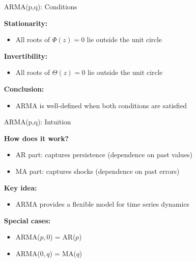 \documentclass[aspectratio=169]{beamer}
\begin{document}
\begin{frame}{ARMA(p,q): Conditions}

\textbf{Stationarity:}
\begin{itemize}
    \item All roots of $\Phi(z)=0$ lie outside the unit circle
\end{itemize}

\vspace{0.4cm}

\textbf{Invertibility:}
\begin{itemize}
    \item All roots of $\Theta(z)=0$ lie outside the unit circle
\end{itemize}

\vspace{0.4cm}

\textbf{Conclusion:}
\begin{itemize}
    \item ARMA is well-defined when both conditions are satisfied
\end{itemize}

\end{frame}

\begin{frame}{ARMA(p,q): Intuition}

\textbf{How does it work?}

\begin{itemize}
    \item AR part: captures persistence (dependence on past values)
    \item MA part: captures shocks (dependence on past errors)
\end{itemize}

\vspace{0.4cm}

\textbf{Key idea:}
\begin{itemize}
    \item ARMA provides a flexible model for time series dynamics
\end{itemize}

\vspace{0.4cm}

\textbf{Special cases:}
\begin{itemize}
    \item ARMA($p,0$) = AR($p$)
    \item ARMA($0,q$) = MA($q$)
\end{itemize}

\end{frame}
\end{document}

